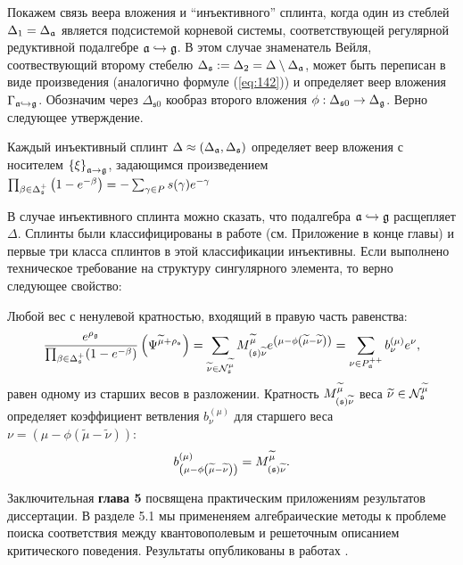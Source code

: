 \documentclass[14pt,autoref,href,facsimile
]{disser}
\begin{document}
Покажем связь веера вложения и ``инъективного'' сплинта, когда один из стеблей $\Delta _{1}=\Delta _{\mathfrak{a}}$  является подсистемой корневой системы, соответствующей регулярной редуктивной подалгебре $\mathfrak{a}\hookrightarrow \mathfrak{g}$. В этом случае знаменатель Вейля, соотвествующий второму стебелю $\Delta _{\mathfrak{s}}:=\Delta_{2}=\Delta \setminus \Delta _{\mathfrak{a}}$, может быть переписан в виде произведения (аналогично формуле (\ref{eq:142})) и определяет веер вложения  $\Gamma _{\mathfrak{a}\hookrightarrow \mathfrak{g}}$. Обозначим через $\Delta_{\mathfrak{s}0}$ кообраз второго вложения $\phi:\Delta_{\mathfrak{s}0}\to \Delta_{\mathfrak{g}}$. Верно следующее утверждение.
\vspace{-0.3cm}
\begin{statement}
Каждый инъективный сплинт $\Delta \approx (\Delta _{\mathfrak{a}},\Delta _{\mathfrak{s}})$ определяет веер вложения с носителем $\left\{ \xi \right\} _{\mathfrak{a}\rightarrow \mathfrak{g}}$, задающимся произведением\\
$
\prod_{\beta \in \Delta _{\mathfrak{s}}^{+}}\left( 1-e^{-\beta }\right)
=-\sum_{\gamma \in P}s(\gamma )e^{-\gamma }$
\end{statement}
В случае инъективного сплинта можно сказать, что подалгебра $\mathfrak{a}\hookrightarrow \mathfrak{g}$ расщепляет $\Delta$.  Сплинты были классифицированы в работе \cite{richter2008splints}  (см. Приложение в конце главы) и первые три класса сплинтов в этой классификации инъективны. Если выполнено техническое требование на структуру сингулярного элемента, то верно следующее свойство:
\vspace{-0.3cm}
\begin{Prop}
Любой вес с ненулевой кратностью, входящий в правую часть равенства:
\[
\frac{e^{\rho _{\gf}}}{\prod_{\beta \in \Delta _{\sfr%
}^{+}}(1-e^{-\beta })}\left( \Psi ^{\widetilde{\mu }+\rho _{\sfr%
}}\right) =\sum_{\widetilde{\nu }\in \mathcal{N}_{\sfr}^{\widetilde{\mu }%
}}M_{\left( \sfr\right) \widetilde{\nu }}^{\widetilde{\mu }}e^{\left(
\mu -\phi \left( \widetilde{\mu }-\widetilde{\nu }\right) \right)
}=\sum_{\nu \in P_{\af}^{++}}b_{\nu }^{(\mu )}e^{\nu },
\]
равен одному из старших весов в разложении. Кратность $M_{\left( \mathfrak{s}
\right) \widetilde{\nu }}^{\widetilde{\mu }}$ веса  $\widetilde{\nu}\in \mathcal{N}_{\mathfrak{s}}^{\widetilde{\mu }}$ определяет коэффициент ветвления  $b_{\nu }^{(\mu )}$ для старшего веса $\nu =\left( \mu-\phi \left( \widetilde{\mu }-\widetilde{\nu }\right) \right) $:
\[
b_{\left( \mu -\phi \left( \widetilde{\mu }-\widetilde{\nu }\right) \right)
}^{(\mu )}=M_{\left( \mathfrak{s}\right) \widetilde{\nu }}^{\widetilde{\mu }}.
\]
\end{Prop}
Заключительная \textbf{глава 5} посвящена практическим приложениям результатов диссертации.
 В разделе 5.1 мы примененяем алгебраические методы к проблеме поиска соответствия между квантовополевым и решеточным описанием критического поведения. Результаты опубликованы в работах .
\end{document}
